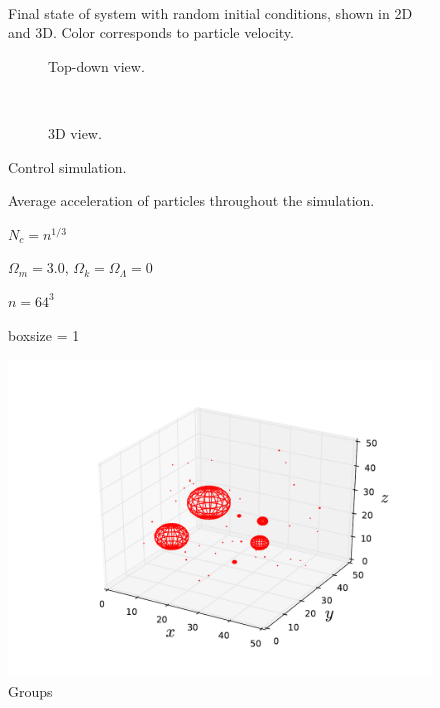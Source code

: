 \documentclass[10pt]{article}
\begin{document}
\begin{figure}[htbp]
\centering
\begin{subfigure}{\textwidth}
\centering

\end{subfigure} \\
\begin{subfigure}{\textwidth}
\centering

\end{subfigure}
\caption{Final state of system with random initial conditions, shown in 2D and 3D. Color corresponds to particle velocity.}
\label{fig:randomic}
\end{figure}

\begin{figure}[htbp]
\centering
\begin{subfigure}{\textwidth}
\centering

\caption{Top-down view.}
\end{subfigure} \\
\begin{subfigure}{\textwidth}
\centering

\caption{3D view.}
\end{subfigure}
\caption{Control simulation.}
\label{fig:control}
\end{figure}

\begin{figure}[htbp]
\centering

\label{fig:accel}
\caption{Average acceleration of particles throughout the simulation.}
\end{figure}

\begin{figure}[htbp]
\centering

\caption{$N_c = n^{1/3}$}
\label{fig:1ncells}
\end{figure}

\begin{figure}[htbp]
\centering

\caption{$\Omega_m = 3.0$, $\Omega_k = \Omega_\Lambda = 0$}
\label{fig:3mass}
\end{figure}

\begin{figure}[htbp]
\centering

\caption{$n = 64^3$}
\label{fig:n64}
\end{figure}

\begin{figure}[htbp]
\centering

\caption{boxsize = 1}
\label{fig:1boxsize}
\end{figure}

\begin{figure}[htbp]
\centering
\includegraphics{Control_Groups.pdf}
\caption{Groups}
\label{fig:groups}
\end{figure}
\end{document}
